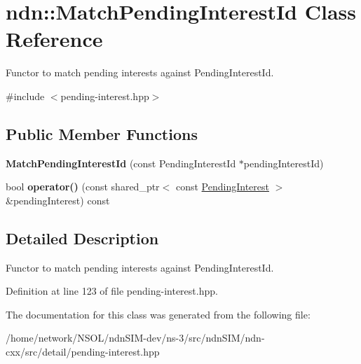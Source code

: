 \hypertarget{classndn_1_1MatchPendingInterestId}{}\section{ndn\+:\+:Match\+Pending\+Interest\+Id Class Reference}
\label{classndn_1_1MatchPendingInterestId}


Functor to match pending interests against Pending\+Interest\+Id.  




{\ttfamily \#include $<$pending-\/interest.\+hpp$>$}

\subsection*{Public Member Functions}
\begin{DoxyCompactItemize}
\item 
{\bfseries Match\+Pending\+Interest\+Id} (const Pending\+Interest\+Id $\ast$pending\+Interest\+Id)\hypertarget{classndn_1_1MatchPendingInterestId_a84c6cad44f705d592c4018f62e408df9}{}\label{classndn_1_1MatchPendingInterestId_a84c6cad44f705d592c4018f62e408df9}

\item 
bool {\bfseries operator()} (const shared\+\_\+ptr$<$ const \hyperlink{classndn_1_1PendingInterest}{Pending\+Interest} $>$ \&pending\+Interest) const\hypertarget{classndn_1_1MatchPendingInterestId_a517f69dca9ebda0594f2bc4257a1366e}{}\label{classndn_1_1MatchPendingInterestId_a517f69dca9ebda0594f2bc4257a1366e}

\end{DoxyCompactItemize}


\subsection{Detailed Description}
Functor to match pending interests against Pending\+Interest\+Id. 

Definition at line 123 of file pending-\/interest.\+hpp.



The documentation for this class was generated from the following file\+:\begin{DoxyCompactItemize}
\item 
/home/network/\+N\+S\+O\+L/ndn\+S\+I\+M-\/dev/ns-\/3/src/ndn\+S\+I\+M/ndn-\/cxx/src/detail/pending-\/interest.\+hpp\end{DoxyCompactItemize}
